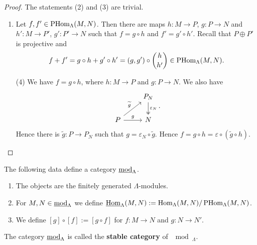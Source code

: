 
\begin{proof} The statements (2) and (3) are trivial.
\begin{enumerate}
\item Let $f,f'\in\PHom_\Lambda(M,N)$. Then there are maps $h : M\to P$, $g:P\to N$ and $h' : M\to P'$, $g':P'\to N$ such that $f=g\circ h$ and $f'=g'\circ h'$. Recall that $P\oplus P'$ is projective and
\[
f+f'=g\circ h + g'\circ h' = (g,g')\circ \binom{h}{h'} \in \PHom_\Lambda(M,N).
\]
\item[(4)] We have $f=g\circ h$, where $h:M\to P$ and $g:P\to N$. We also have
%
\[
\begin{tikzcd}
	& P_N\ar[d,twoheadrightarrow,"\varepsilon_N"] \\
	P \ar[ru,"\widetilde g"] \ar[r,"g"] & N
\end{tikzcd}.
\]
%
Hence there is $\widetilde g:P\to P_N$ such that $g=\varepsilon_N\circ \widetilde g$. Hence $f=g\circ h = \varepsilon \circ (\widetilde g\circ h)$.\qedhere
\end{enumerate}
\end{proof}


\begin{proposition}\label{2.2.3}
The following data define a category $\underline{\mod}_\Lambda$.
\begin{enumerate}[label=\textup{(\alph*)}]
\item The objects are the finitely generated $\Lambda$-modules.
\item For $M,N\in\umod_\Lambda$ we define $\underline{\Hom}_\Lambda(M,N):=\Hom_\Lambda(M,N)/\PHom_\Lambda(M,N)$.
\item We define $[g]\circ [f]:=[g\circ f]$ for $f:M\to N$ and $g:N\to N'$.
\end{enumerate}
\end{proposition}


\begin{definition}
The category $\umod_\Lambda$ is called the \textbf{stable category} of $\mod_\Lambda$.
\end{definition}

